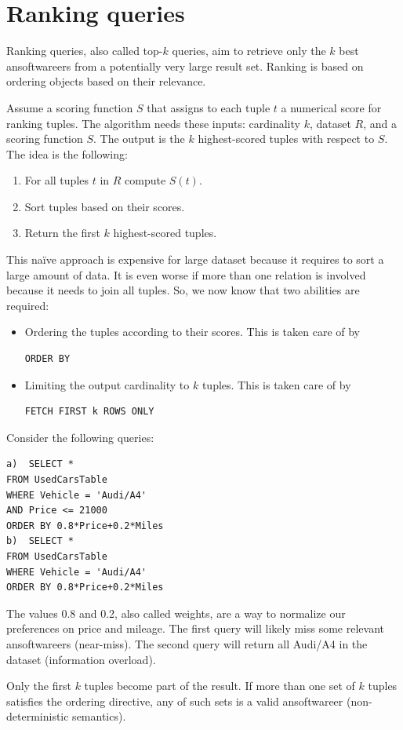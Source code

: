 \section{Ranking queries}

Ranking queries, also called top-$k$ queries, aim to retrieve only the $k$ best ansoftwareers from a potentially very large result set. Ranking is based on ordering objects based on their relevance.

Assume a scoring function $S$ that assigns to each tuple $t$ a numerical score for ranking tuples. The algorithm needs these inputs: cardinality $k$, dataset $R$, and a scoring function $S$. The output is 
the $k$ highest-scored tuples with respect to $S$. The idea is the following: 
\begin{enumerate}
    \item For all tuples $t$ in $R$ compute $S(t)$. 
    \item Sort tuples based on their scores.
    \item Return the first $k$ highest-scored tuples. 
\end{enumerate}
This naïve approach is expensive for large dataset because it requires to sort a large amount of data. It is even worse if more than one relation is involved because it needs to join all tuples. So, 
we now know that two abilities are required: 
\begin{itemize}
    \item Ordering the tuples according to their scores. This is taken care of by 
        \begin{lstlisting}[style=SQL]
ORDER BY
        \end{lstlisting}
    \item Limiting the output cardinality to $k$ tuples. This is taken care of by 
        \begin{lstlisting}[style=SQL]
FETCH FIRST k ROWS ONLY
        \end{lstlisting}
\end{itemize} 
\begin{example}
    Consider the following queries: 
    \begin{lstlisting}[style=SQL]
a)  SELECT *
FROM UsedCarsTable
WHERE Vehicle = 'Audi/A4'
AND Price <= 21000
ORDER BY 0.8*Price+0.2*Miles
b)  SELECT *
FROM UsedCarsTable
WHERE Vehicle = 'Audi/A4'
ORDER BY 0.8*Price+0.2*Miles
    \end{lstlisting}
    The values 0.8 and 0.2, also called weights, are a way to normalize our preferences on price and mileage.
    The first query will likely miss some relevant ansoftwareers (near-miss). The second query will return all Audi/A4 in the dataset (information overload).
\end{example}
Only the first $k$ tuples become part of the result. If more than one set of $k$ tuples satisfies the ordering directive, any of such sets is a valid ansoftwareer 
(non-deterministic semantics). 

